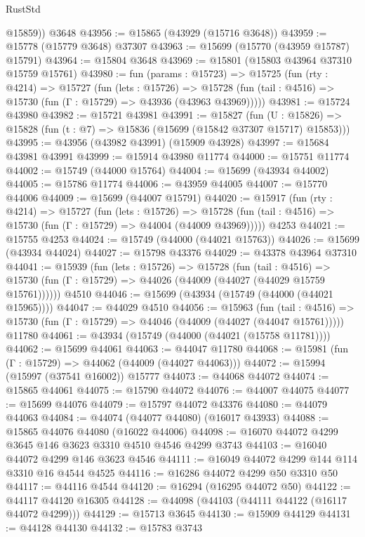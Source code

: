 \begin{lexlean}{RustStd}
\begin{coremodule}
        @15859))
    @3648
@43956 := @15865 (@43929 (@15716 @3648))
@43959 := @15778 (@15779 @3648) @37307
@43963 := @15699 (@15770 (@43959 @15787) @15791)
@43964 := @15804 @3648
@43969 := @15801 (@15803 @43964 @37310 @15759 @15761)
@43980 := fun (params : @15723) =>
  @15725
    (fun (rty : @4214) =>
    @15727
      (fun (lets : @15726) =>
      @15728 (fun (tail : @4516) => @15730 (fun (Γ : @15729) => @43936 (@43963 @43969)))))
@43981 := @15724 @43980
@43982 := @15721 @43981
@43991 := @15827
    (fun (U : @15826) => @15828 (fun (t : @7) => @15836 (@15699 (@15842 @37307 @15717) @15853)))
@43995 := @43956 (@43982 @43991) (@15909 @43928)
@43997 := @15684 @43981 @43991
@43999 := @15914 @43980 @11774
@44000 := @15751 @11774
@44002 := @15749 (@44000 @15764)
@44004 := @15699 (@43934 @44002)
@44005 := @15786 @11774
@44006 := @43959 @44005
@44007 := @15770 @44006
@44009 := @15699 (@44007 @15791)
@44020 := @15917
    (fun (rty : @4214) =>
    @15727
      (fun (lets : @15726) =>
      @15728 (fun (tail : @4516) => @15730 (fun (Γ : @15729) => @44004 (@44009 @43969)))))
    @4253
@44021 := @15755 @4253
@44024 := @15749 (@44000 (@44021 @15763))
@44026 := @15699 (@43934 @44024)
@44027 := @15798 @43376
@44029 := @43378 @43964 @37310
@44041 := @15939
    (fun (lets : @15726) =>
    @15728
      (fun (tail : @4516) =>
      @15730 (fun (Γ : @15729) => @44026 (@44009 (@44027 (@44029 @15759 @15761))))))
    @4510
@44046 := @15699 (@43934 (@15749 (@44000 (@44021 @15965))))
@44047 := @44029 @4510
@44056 := @15963
    (fun (tail : @4516) => @15730 (fun (Γ : @15729) => @44046 (@44009 (@44027 (@44047 @15761)))))
    @11780
@44061 := @43934 (@15749 (@44000 (@44021 (@15758 @11781))))
@44062 := @15699 @44061
@44063 := @44047 @11780
@44068 := @15981 (fun (Γ : @15729) => @44062 (@44009 (@44027 @44063)))
@44072 := @15994 (@15997 (@37541 @16002)) @15777
@44073 := @44068 @44072
@44074 := @15865 @44061
@44075 := @15790 @44072
@44076 := @44007 @44075
@44077 := @15699 @44076
@44079 := @15797 @44072 @43376
@44080 := @44079 @44063
@44084 := @44074 (@44077 @44080) (@16017 @43933)
@44088 := @15865 @44076 @44080 (@16022 @44006)
@44098 := @16070 @44072 @4299 @3645 @146 @3623 @3310 @4510 @4546 @4299 @3743
@44103 := @16040 @44072 @4299 @146 @3623 @4546
@44111 := @16049 @44072 @4299 @144 @114 @3310 @16 @4544 @4525
@44116 := @16286 @44072 @4299 @50 @3310 @50
@44117 := @44116 @4544
@44120 := @16294 (@16295 @44072 @50)
@44122 := @44117 @44120 @16305
@44128 := @44098 (@44103 (@44111 @44122 (@16117 @44072 @4299)))
@44129 := @15713 @3645
@44130 := @15909 @44129
@44131 := @44128 @44130
@44132 := @15783 @3743

\end{coremodule}
\end{lexlean}
